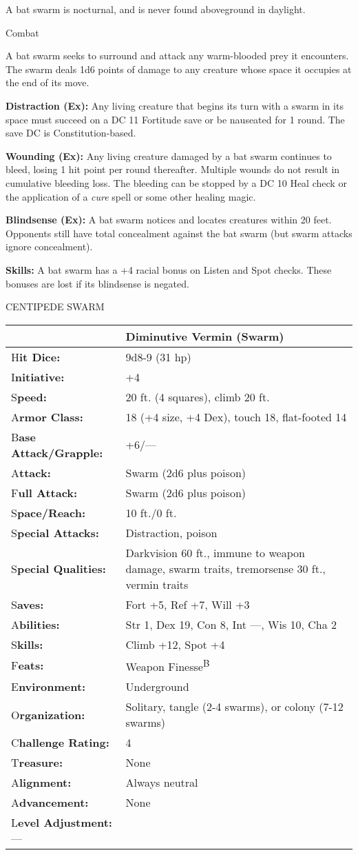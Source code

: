 \documentclass{article}
\begin{document}
A bat swarm is nocturnal, and is never found aboveground in daylight.

Combat

A bat swarm seeks to surround and attack any warm-blooded prey it encounters. The 
swarm deals 1d6 points of damage to any creature whose space it occupies at the 
end of its move.

\textbf{Distraction (Ex): }Any living creature that begins its turn with a swarm 
in its space must succeed on a DC 11 Fortitude save or be nauseated for 1 round. 
The save DC is Constitution-based.

\textbf{Wounding (Ex):} Any living creature damaged by a bat swarm continues to 
bleed, losing 1 hit point per round thereafter. Multiple wounds do not result in 
cumulative bleeding loss. The bleeding can be stopped by a DC 10 Heal check or 
the application of a \textit{cure }spell or some other healing magic.

\textbf{Blindsense (Ex):} A bat swarm notices and locates creatures within 20 feet. 
Opponents still have total concealment against the bat swarm (but swarm attacks 
ignore concealment). 

\textbf{Skills:} A bat swarm has a +4 racial bonus on Listen and Spot checks. These 
bonuses are lost if its blindsense is negated. 

\vspace{12pt}
CENTIPEDE SWARM

\begin{tabular}{|>{\raggedright}p{91pt}|>{\raggedright}p{204pt}|}
\hline
  & Diminutive Vermin (Swarm)\tabularnewline
\hline
H\textbf{it Dice:} & 9d8-9 (31 hp)\tabularnewline
\hline
I\textbf{nitiative:} & +4\tabularnewline
\hline
S\textbf{peed:} & 20 ft. (4 squares), climb 20 ft.\tabularnewline
\hline
A\textbf{rmor Class:} & 18 (+4 size, +4 Dex), touch 18, flat-footed 14\tabularnewline
\hline
B\textbf{ase Attack/Grapple:} & +6/---\tabularnewline
\hline
A\textbf{ttack:} & Swarm (2d6 plus poison)\tabularnewline
\hline
F\textbf{ull Attack:} & Swarm (2d6 plus poison)\tabularnewline
\hline
S\textbf{pace/Reach:} & 10 ft./0 ft.\tabularnewline
\hline
S\textbf{pecial Attacks:} & Distraction, poison\tabularnewline
\hline
S\textbf{pecial Qualities:} & Darkvision 60 ft., immune to weapon damage, swarm 
traits, tremorsense 30 ft., vermin traits\tabularnewline
\hline
S\textbf{aves:} & Fort +5, Ref +7, Will +3\tabularnewline
\hline
A\textbf{bilities:} & Str 1, Dex 19, Con 8, Int ---, Wis 10, Cha 2\tabularnewline
\hline
S\textbf{kills:} & Climb +12, Spot +4\tabularnewline
\hline
F\textbf{eats:} & Weapon Finesse\textsuperscript{B}\tabularnewline
\hline
E\textbf{nvironment:} & Underground\tabularnewline
\hline
O\textbf{rganization:} & Solitary, tangle (2-4 swarms), or colony (7-12 swarms)\tabularnewline
\hline
C\textbf{hallenge Rating:} & 4\tabularnewline
\hline
T\textbf{reasure:} & None\tabularnewline
\hline
A\textbf{lignment:} & Always neutral\tabularnewline
\hline
A\textbf{dvancement:} & None\tabularnewline
\hline
L\textbf{evel Adjustment:}--- & \tabularnewline
\hline
\end{tabular}
\end{document}
